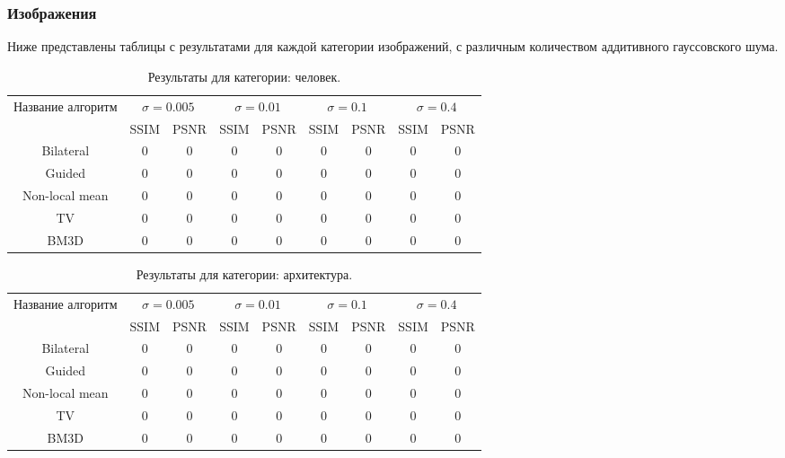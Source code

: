 \subsubsection{Изображения}
Ниже представлены таблицы с результатами для каждой категории изображений, с различным количеством аддитивного гауссовского шума.
\begin{table}[H]
	\caption{\label{tab:bolts} Результаты для категории: человек.}
\begin{tabular}{|c|c|c|c|c|c|c|c|c|}
	\hline
	Название алгоритм & \multicolumn{2}{|c|}{$\sigma=0.005$}  & \multicolumn{2}{|c|}{$\sigma=0.01$}& \multicolumn{2}{|c|}{$\sigma=0.1$} & \multicolumn{2}{|c|}{$\sigma=0.4$} \\
	\cline{2-9}
	 & SSIM  & PSNR & SSIM  & PSNR & SSIM  & PSNR & SSIM  & PSNR\\
	\hline
	Bilateral & 0 & 0& 0 & 0& 0 & 0 & 0 & 0 \\
	\hline
	Guided & 0 & 0& 0 & 0& 0 & 0 & 0 & 0 \\
	\hline
	Non-local mean & 0 & 0& 0 & 0& 0 & 0 & 0 & 0 \\
	\hline
	TV & 0 & 0& 0 & 0& 0 & 0 & 0 & 0 \\
	\hline
	BM3D & 0 & 0& 0 & 0& 0 & 0 & 0 & 0 \\
	\hline	
\end{tabular}
\end{table}

\begin{table}[H]
	\caption{\label{tab:bolts} Результаты для категории: архитектура.}
	\begin{tabular}{|c|c|c|c|c|c|c|c|c|}
		\hline
		Название алгоритм & \multicolumn{2}{|c|}{$\sigma=0.005$}  & \multicolumn{2}{|c|}{$\sigma=0.01$}& \multicolumn{2}{|c|}{$\sigma=0.1$} & \multicolumn{2}{|c|}{$\sigma=0.4$} \\
		\cline{2-9}
		& SSIM  & PSNR & SSIM  & PSNR & SSIM  & PSNR & SSIM  & PSNR\\
		\hline
		Bilateral & 0 & 0& 0 & 0& 0 & 0 & 0 & 0 \\
		\hline
		Guided & 0 & 0& 0 & 0& 0 & 0 & 0 & 0 \\
		\hline
		Non-local mean & 0 & 0& 0 & 0& 0 & 0 & 0 & 0 \\
		\hline
		TV & 0 & 0& 0 & 0& 0 & 0 & 0 & 0 \\
		\hline
		BM3D & 0 & 0& 0 & 0& 0 & 0 & 0 & 0 \\
		\hline	
	\end{tabular}
\end{table}

